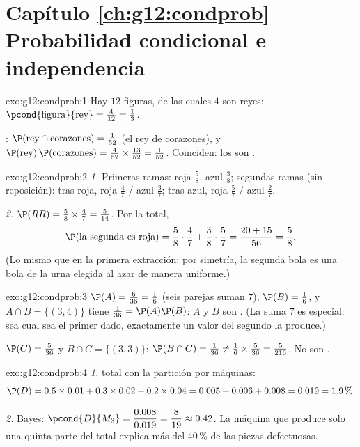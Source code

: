 \section*{Capítulo \ref{ch:g12:condprob} --- Probabilidad condicional e independencia}

\begin{solution}{exo:g12:condprob:1}
Hay $12$ figuras, de las cuales $4$ son reyes:
$\pcond{\text{figura}}{\text{rey}} = \frac{4}{12} = \frac13$.

:
$\P(\text{rey} \cap \text{corazones}) = \frac{1}{52}$ (el rey de
corazones), y
$\P(\text{rey})\,\P(\text{corazones}) = \frac{4}{52}\times\frac{13}{52}
= \frac{1}{52}$. Coinciden: los  son .
\end{solution}

\begin{solution}{exo:g12:condprob:2}
\emph{1.} Primeras ramas: roja $\frac58$, azul $\frac38$; segundas ramas
(sin reposición): tras roja, roja $\frac47$ / azul $\frac37$; tras azul,
roja $\frac57$ / azul $\frac27$.

\emph{2.} $\P(RR) = \frac58 \times \frac47 = \frac{5}{14}$. Por la
 total,
\[
\P(\text{la segunda es roja}) = \frac58\cdot\frac47
+ \frac38\cdot\frac57 = \frac{20 + 15}{56} = \frac58 .
\]
(Lo mismo que en la primera extracción: por simetría, la segunda bola es
una bola de la urna elegida al azar de manera uniforme.)
\end{solution}

\begin{solution}{exo:g12:condprob:3}
$\P(A) = \frac{6}{36} = \frac16$ (seis parejas suman $7$),
$\P(B) = \frac16$, y $A \cap B = \{(3,4)\}$ tiene 
$\frac{1}{36} = \P(A)\P(B)$: $A$ y $B$ son . (La suma $7$ es
especial: sea cual sea el primer dado, exactamente un valor del segundo la
produce.)

$\P(C) = \frac{5}{36}$ y $B \cap C = \{(3,3)\}$:
$\P(B \cap C) = \frac{1}{36} \neq \frac16 \times \frac{5}{36}
= \frac{5}{216}$. No son .
\end{solution}

\begin{solution}{exo:g12:condprob:4}
\emph{1.}  total con la partición por máquinas:
\[
\P(D) = 0.5\times0.01 + 0.3\times0.02 + 0.2\times0.04
= 0.005 + 0.006 + 0.008 = 0.019 = 1.9\,\% .
\]

\emph{2.} Bayes:
$\pcond{D}{M_3} = \dfrac{0.008}{0.019} = \dfrac{8}{19} \approx 0.42$. La
máquina que produce solo una quinta parte del total explica más del
$40\,\%$ de las piezas defectuosas.
\end{solution}


